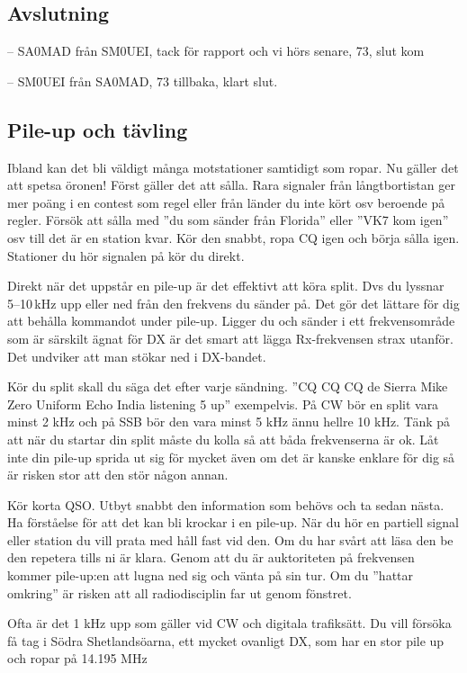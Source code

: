 \subsection{Avslutning}

-- SA0MAD från SM0UEI, tack för rapport och vi hörs senare, 73, slut kom

-- SM0UEI från SA0MAD, 73 tillbaka, klart slut.

\subsection{Pile-up och tävling}

Ibland kan det bli väldigt många motstationer samtidigt som ropar. Nu
gäller det att spetsa öronen! Först gäller det att sålla. Rara
signaler från långtbortistan ger mer poäng i en contest som regel
eller från länder du inte kört osv beroende på regler. Försök att
sålla med ''du som sänder från Florida'' eller ''VK7 kom igen'' osv
till det är en station kvar. Kör den snabbt, ropa CQ igen och börja
sålla igen. Stationer du hör signalen på kör du direkt.

Direkt när det uppstår en pile-up är det effektivt att köra split. Dvs
du lyssnar 5--10\,kHz upp eller ned från den frekvens du sänder
på. Det gör det lättare för dig att behålla kommandot under
pile-up. Ligger du och sänder i ett frekvensområde som är särskilt
ägnat för DX är det smart att lägga Rx-frekvensen strax utanför. Det
undviker att man stökar ned i DX-bandet.

Kör du split skall du säga det efter varje sändning. ''CQ CQ CQ de Sierra Mike
Zero Uniform Echo India listening 5 up'' exempelvis. På CW bör en split vara
minst 2 kHz och på SSB bör den vara minst 5 kHz ännu hellre 10 kHz. Tänk på att
när du startar din split måste du kolla så att båda frekvenserna är ok. Låt inte
din pile-up sprida ut sig för mycket även om det är kanske enklare för dig så är
risken stor att den stör någon annan.

Kör korta QSO. Utbyt snabbt den information som behövs och ta sedan nästa. Ha
förståelse för att det kan bli krockar i en pile-up. När du hör en partiell
signal eller station du vill prata med håll fast vid den. Om du har svårt att
läsa den be den repetera tills ni är klara. Genom att du är auktoriteten på
frekvensen kommer pile-up:en att lugna ned sig och vänta på sin tur. Om du
''hattar omkring'' är risken att all radiodisciplin far ut genom fönstret.

Ofta är det 1 kHz upp som gäller vid CW och digitala trafiksätt.  Du vill
försöka få tag i Södra Shetlandsöarna, ett mycket ovanligt DX, som har en stor
pile up och ropar på 14.195 MHz

